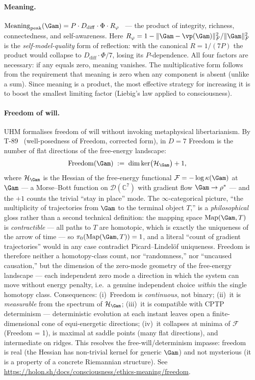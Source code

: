\paragraph{Meaning.}
$\mathrm{Meaning}_{\mathrm{peak}}(\Gam) = P \cdot D_{\mathrm{diff}} \cdot \Phi \cdot
R_\varphi$~ --- the product of integrity, richness, connectedness, and self-awareness.
Here $R_\varphi = 1 - \|\Gam - \vp(\Gam)\|_F^2/\|\Gam\|_F^2$ is the \emph{self-model-quality}
form of reflection: with the canonical $R = 1/(7P)$ the product would collapse to
$D_{\mathrm{diff}} \cdot \Phi / 7$, losing its $P$-dependence.
All four factors are necessary: if any equals zero, meaning vanishes. The multiplicative
form follows from the requirement that meaning is zero when any component is absent
(unlike a sum). Since meaning is a product, the most effective strategy for increasing it
is to boost the smallest limiting factor (Liebig's law applied to consciousness).

\paragraph{Freedom of will.}
UHM formalises freedom of will without invoking metaphysical libertarianism.
By T-89~ (well-posedness of Freedom, corrected form), in $D = 7$
Freedom is the number of flat directions of the free-energy landscape:
\begin{equation}
  \mathrm{Freedom}(\Gam) \;:=\; \dim\ker\bigl(\mathcal H_\Gam\bigr) + 1,
  \label{eq:freedom}
\end{equation}
where $\mathcal H_\Gam$ is the Hessian of the free-energy functional
$\mathcal F = -\log\kappa(\Gam)$ at $\Gam$ --- a Morse--Bott function on
$\mathcal D(\mathbb C^7)$ with gradient flow $\Gam \to \rho^*$ --- and the
$+1$ counts the trivial ``stay in place'' mode. The $\infty$-categorical
picture, ``the multiplicity of trajectories from $\Gam$ to the terminal object
$T$,'' is a \emph{philosophical} gloss rather than a second technical
definition: the mapping space $\mathrm{Map}(\Gam, T)$ is \emph{contractible}
--- all paths to $T$ are homotopic, which is exactly the uniqueness of the
arrow of time --- so $\pi_0(\mathrm{Map}(\Gam, T)) = 1$, and a literal ``count
of gradient trajectories'' would in any case contradict Picard--Lindel\"of
uniqueness. Freedom is therefore neither a homotopy-class count, nor
``randomness,'' nor ``uncaused causation,'' but the dimension of the zero-mode
geometry of the free-energy landscape --- each independent zero mode a
direction in which the system can move without energy penalty, i.e.\ a genuine
independent choice \emph{within} the single homotopy class. Consequences:
(i)~Freedom is \emph{continuous}, not binary; (ii)~it is \emph{measurable}
from the spectrum of $\mathcal H_\Gam$; (iii)~it is compatible with CPTP
determinism --- deterministic evolution at each instant leaves open a
finite-dimensional cone of equi-energetic directions; (iv)~it collapses at
minima of $\mathcal F$ (Freedom = 1), is maximal at saddle points (many
flat directions), and intermediate on ridges. This resolves the
free-will/determinism impasse: freedom is real (the Hessian has non-trivial
kernel for generic $\Gam$) and not mysterious (it is a property of a
concrete Riemannian structure). See
\url{https://holon.sh/docs/consciousness/ethics-meaning/freedom}.
